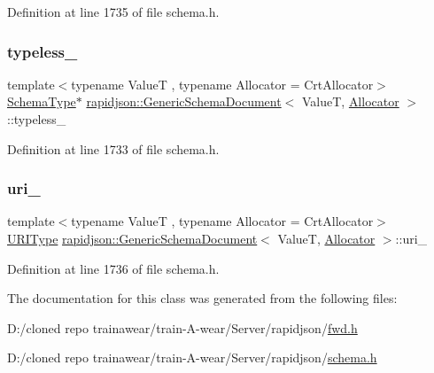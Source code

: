 Definition at line 1735 of file schema.\+h.

\mbox{\label{classrapidjson_1_1_generic_schema_document_afb1ea66bb78ed9da2285c0b946d6d181}} 
\subsubsection{\texorpdfstring{typeless\_}{typeless\_}}
{\footnotesize\ttfamily template$<$typename ValueT , typename Allocator  = Crt\+Allocator$>$ \\
\mbox{\hyperlink{classrapidjson_1_1_generic_schema_document_aaf4e7f371de938025f7ed4be3b83266e}{Schema\+Type}}$\ast$ \mbox{\hyperlink{classrapidjson_1_1_generic_schema_document}{rapidjson\+::\+Generic\+Schema\+Document}}$<$ ValueT, \mbox{\hyperlink{classrapidjson_1_1_allocator}{Allocator}} $>$\+::typeless\+\_\+\hspace{0.3cm}{\ttfamily [private]}}



Definition at line 1733 of file schema.\+h.

\mbox{\label{classrapidjson_1_1_generic_schema_document_a5d27a5ae1ddf4ffd702269654168f826}} 
\subsubsection{\texorpdfstring{uri\_}{uri\_}}
{\footnotesize\ttfamily template$<$typename ValueT , typename Allocator  = Crt\+Allocator$>$ \\
\mbox{\hyperlink{classrapidjson_1_1_generic_schema_document_a72e8240701d707953bfd806cddc995b6}{U\+R\+I\+Type}} \mbox{\hyperlink{classrapidjson_1_1_generic_schema_document}{rapidjson\+::\+Generic\+Schema\+Document}}$<$ ValueT, \mbox{\hyperlink{classrapidjson_1_1_allocator}{Allocator}} $>$\+::uri\+\_\+\hspace{0.3cm}{\ttfamily [private]}}



Definition at line 1736 of file schema.\+h.



The documentation for this class was generated from the following files\+:\begin{DoxyCompactItemize}
\item 
D\+:/cloned repo trainawear/train-\/\+A-\/wear/\+Server/rapidjson/\mbox{\hyperlink{fwd_8h}{fwd.\+h}}\item 
D\+:/cloned repo trainawear/train-\/\+A-\/wear/\+Server/rapidjson/\mbox{\hyperlink{schema_8h}{schema.\+h}}\end{DoxyCompactItemize}
